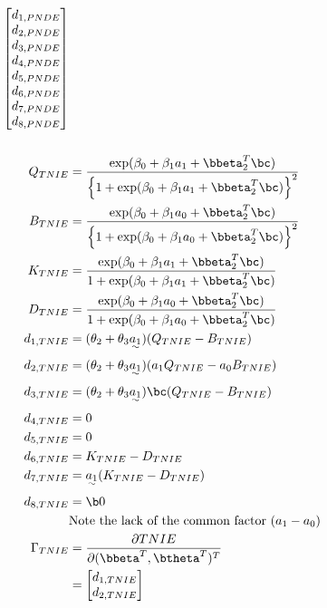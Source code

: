 \documentclass[dvipdfmx,10pt]{article}
\begin{document}
\begin{align*}
    \begin{bmatrix}
      d_{1,PNDE}\\
      d_{2,PNDE}\\
      d_{3,PNDE}\\
      d_{4,PNDE}\\
      d_{5,PNDE}\\
      d_{6,PNDE}\\
      d_{7,PNDE}\\
      d_{8,PNDE}\\
    \end{bmatrix}\\
  \\
  Q_{TNIE} &= \frac
      {            \exp(\beta_{0} + \beta_{1}a_{1} + \bbeta_{2}^{T}\bc)}
      {\left\{ 1 + \exp(\beta_{0} + \beta_{1}a_{1} + \bbeta_{2}^{T}\bc) \right\}^{2}}\\
  B_{TNIE} &= \frac
      {            \exp(\beta_{0} + \beta_{1}a_{0} + \bbeta_{2}^{T}\bc)}
      {\left\{ 1 + \exp(\beta_{0} + \beta_{1}a_{0} + \bbeta_{2}^{T}\bc) \right\}^{2}}\\
  K_{TNIE} &= \frac
      {    \exp(\beta_{0} + \beta_{1}a_{1} + \bbeta_{2}^{T}\bc)}
      {1 + \exp(\beta_{0} + \beta_{1}a_{1} + \bbeta_{2}^{T}\bc)}\\
  D_{TNIE} &= \frac
      {    \exp(\beta_{0} + \beta_{1}a_{0} + \bbeta_{2}^{T}\bc)}
      {1 + \exp(\beta_{0} + \beta_{1}a_{0} + \bbeta_{2}^{T}\bc)}\\
  d_{1,TNIE} &= (\theta_{2} + \theta_{3}\uwave{a_{1}}) (Q_{TNIE} - B_{TNIE})\\
  d_{2,TNIE} &= (\theta_{2} + \theta_{3}\uwave{a_{1}}) (a_{1}Q_{TNIE} - a_{0}B_{TNIE})\\
  d_{3,TNIE} &= (\theta_{2} + \theta_{3}\uwave{a_{1}})\bc (Q_{TNIE} - B_{TNIE})\\
  d_{4,TNIE} &= 0\\
  d_{5,TNIE} &= 0\\
  d_{6,TNIE} &= K_{TNIE} - D_{TNIE}\\
  d_{7,TNIE} &= \uwave{a_{1}} (K_{TNIE} - D_{TNIE})\\
  d_{8,TNIE} &= \b0\\
  &\text{Note the lack of the common factor }(a_{1} - a_{0})\\
  \Gamma_{TNIE}
  &= \frac{\partial TNIE}{\partial (\bbeta^{T},\btheta^{T})^{T}}\\
  &= \begin{bmatrix}
      d_{1,TNIE}\\
      d_{2,TNIE}\\

\end{bmatrix}
\end{align*}
\end{document}
